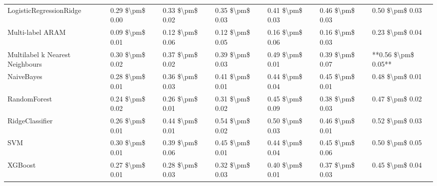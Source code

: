 \begin{tabular}{lllllll}
        LogisticRegressionRidge & 0.29 \$\textbackslash pm\$ 0.00 &           0.33 \$\textbackslash pm\$ 0.02 &       0.35 \$\textbackslash pm\$ 0.03 &        0.41 \$\textbackslash pm\$ 0.03 &                         0.46 \$\textbackslash pm\$ 0.03 &     0.50 \$\textbackslash pm\$ 0.03 \\
               Multi-label ARAM & 0.09 \$\textbackslash pm\$ 0.01 &           0.12 \$\textbackslash pm\$ 0.06 &       0.12 \$\textbackslash pm\$ 0.05 &        0.16 \$\textbackslash pm\$ 0.06 &                         0.16 \$\textbackslash pm\$ 0.03 &     0.23 \$\textbackslash pm\$ 0.04 \\
Multilabel k Nearest Neighbours & 0.30 \$\textbackslash pm\$ 0.02 &           0.37 \$\textbackslash pm\$ 0.02 &       0.39 \$\textbackslash pm\$ 0.03 &        0.49 \$\textbackslash pm\$ 0.01 &                         0.39 \$\textbackslash pm\$ 0.07 & **0.56 \$\textbackslash pm\$ 0.05** \\
                     NaiveBayes & 0.28 \$\textbackslash pm\$ 0.01 &           0.36 \$\textbackslash pm\$ 0.03 &       0.41 \$\textbackslash pm\$ 0.01 &        0.44 \$\textbackslash pm\$ 0.04 &                         0.45 \$\textbackslash pm\$ 0.01 &     0.48 \$\textbackslash pm\$ 0.01 \\
                   RandomForest & 0.24 \$\textbackslash pm\$ 0.02 &           0.26 \$\textbackslash pm\$ 0.01 &       0.31 \$\textbackslash pm\$ 0.02 &        0.45 \$\textbackslash pm\$ 0.09 &                         0.38 \$\textbackslash pm\$ 0.03 &     0.47 \$\textbackslash pm\$ 0.02 \\
                RidgeClassifier & 0.26 \$\textbackslash pm\$ 0.01 &           0.44 \$\textbackslash pm\$ 0.01 &       0.54 \$\textbackslash pm\$ 0.02 &        0.50 \$\textbackslash pm\$ 0.03 &                         0.46 \$\textbackslash pm\$ 0.01 &     0.52 \$\textbackslash pm\$ 0.03 \\
                            SVM & 0.30 \$\textbackslash pm\$ 0.01 &           0.39 \$\textbackslash pm\$ 0.06 &       0.45 \$\textbackslash pm\$ 0.01 &        0.44 \$\textbackslash pm\$ 0.04 &                         0.45 \$\textbackslash pm\$ 0.06 &     0.50 \$\textbackslash pm\$ 0.05 \\
                        XGBoost & 0.27 \$\textbackslash pm\$ 0.01 &           0.28 \$\textbackslash pm\$ 0.03 &       0.32 \$\textbackslash pm\$ 0.03 &        0.40 \$\textbackslash pm\$ 0.01 &                         0.37 \$\textbackslash pm\$ 0.03 &     0.45 \$\textbackslash pm\$ 0.04 \\
\bottomrule
\end{tabular}
